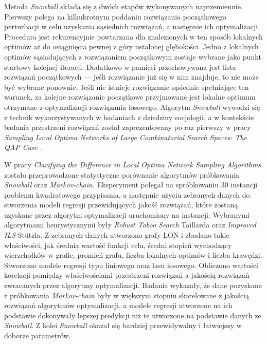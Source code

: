Metoda \textit{Snowball} składa się z dwóch etapów wykonywanych naprzemiennie. Pierwszy polega na kilkukrotnym poddaniu rozwiązania początkowego perturbacji
w celu uzyskania sąsiednich rozwiązań, a następnie ich optymalizacji. Procedura jest rekurencyjnie powtarzana dla znalezionych w ten sposób lokalnych optimów
aż do osiągnięcia pewnej z góry ustalonej głębokości. Jedno z lokalnych optimów sąsiadujących z rozwiązaniem początkowym zostaje wybrane jako punkt startowy kolejnej iteracji.
Dodatkowo w pamięci przechowywana jest lista rozwiązań początkowych --- jeśli rozwiązanie już się w nim znajduje, to nie może być wybrane ponownie.
Jeśli nie istnieje rozwiązanie sąsiednie spełniające ten warunek, za kolejne rozwiązanie początkowe przyjmowane jest lokalne optimum otrzymane z optymalizacji rozwiązania losowego.
Algorytm \textit{Snowball} wywodzi się z technik wykorzystywanych w badaniach z dziedziny socjologii, a w kontekście badania przestrzeni rozwiązań
został zaprezentowany po raz pierwszy w pracy \textit{Sampling Local Optima Networks of Large Combinatorial Search Spaces: The QAP Case}
\cite{DBLP:conf/ppsn/VerelDOT18}.

W pracy \textit{Clarifying the Difference in Local Optima Network Sampling Algorithms} \cite{DBLP:conf/evoW/ThomsonOV19}
zostało przeprowadzone statystyczne porównanie algorytmów próbkowania \textit{Snowball}
oraz \textit{Markov-chain}. Eksperyment polegał na spróbkowaniu 30 instancji problemu kwadratowego przypisania, a następnie użyciu zebranych danych
do stworzenia modeli regresji przewidujących jakość rozwiązań, które zostaną uzyskane przez algorytm optymalizacji uruchomiony na instancji.
Wybranymi algorytmami heurystycznymi były \textit{Robust Taboo Search} Taillarda oraz \textit{Improved ILS} Stützla.
Z zebranych danych utworzono grafy LON i zbadano takie właściwości, jak średnia wartość funkcji celu, średni stopień wychodzący
wierzchołków w grafie, promień grafu, liczba lokalnych optimów i liczba krawędzi.
Stworzono modele regresji typu liniowego oraz lasu losowego. Obliczono wartości korelacji pomiędzy właściwościami przestrzeni rozwiązań
a jakością rozwiązań zwracanych przez algorytmy optymalizacji.
Badania wykazały, że dane pozyskane z próbkowania \textit{Markov-chain} były w większym stopniu skorelowane z jakością rozwiązań algorytmów
optymalizacji, a modele regresji utworzone na ich podstawie dokonywały lepszej predykcji niż te utworzone na podstawie danych ze \textit{Snowball}.
Z kolei \textit{Snowball} okazał się bardziej przewidywalny i łatwiejszy w doborze parametrów.

